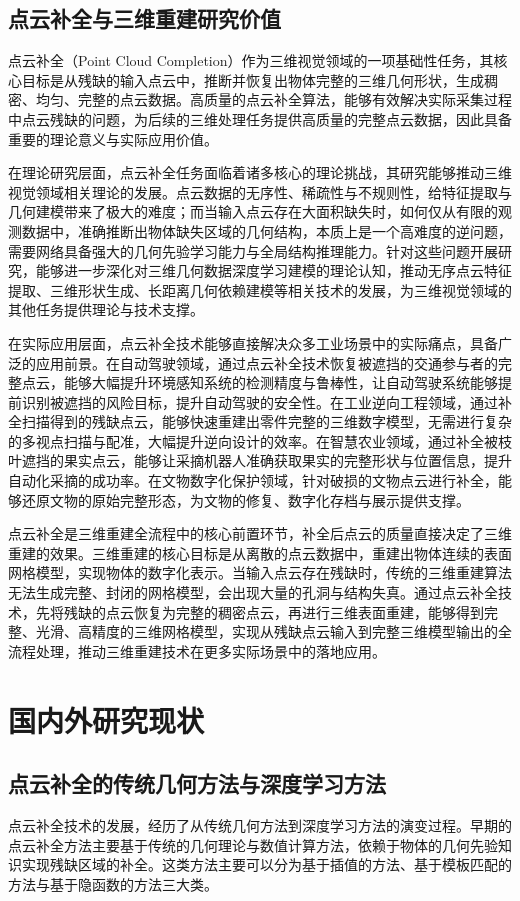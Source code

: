 \subsection{点云补全与三维重建研究价值}
点云补全（Point Cloud Completion）作为三维视觉领域的一项基础性任务，其核心目标是从残缺的输入点云中，推断并恢复出物体完整的三维几何形状，生成稠密、均匀、完整的点云数据。高质量的点云补全算法，能够有效解决实际采集过程中点云残缺的问题，为后续的三维处理任务提供高质量的完整点云数据，因此具备重要的理论意义与实际应用价值。

在理论研究层面，点云补全任务面临着诸多核心的理论挑战，其研究能够推动三维视觉领域相关理论的发展。点云数据的无序性、稀疏性与不规则性，给特征提取与几何建模带来了极大的难度；而当输入点云存在大面积缺失时，如何仅从有限的观测数据中，准确推断出物体缺失区域的几何结构，本质上是一个高难度的逆问题，需要网络具备强大的几何先验学习能力与全局结构推理能力。针对这些问题开展研究，能够进一步深化对三维几何数据深度学习建模的理论认知，推动无序点云特征提取、三维形状生成、长距离几何依赖建模等相关技术的发展，为三维视觉领域的其他任务提供理论与技术支撑。

在实际应用层面，点云补全技术能够直接解决众多工业场景中的实际痛点，具备广泛的应用前景。在自动驾驶领域，通过点云补全技术恢复被遮挡的交通参与者的完整点云，能够大幅提升环境感知系统的检测精度与鲁棒性，让自动驾驶系统能够提前识别被遮挡的风险目标，提升自动驾驶的安全性。在工业逆向工程领域，通过补全扫描得到的残缺点云，能够快速重建出零件完整的三维数字模型，无需进行复杂的多视点扫描与配准，大幅提升逆向设计的效率。在智慧农业领域，通过补全被枝叶遮挡的果实点云，能够让采摘机器人准确获取果实的完整形状与位置信息，提升自动化采摘的成功率。在文物数字化保护领域，针对破损的文物点云进行补全，能够还原文物的原始完整形态，为文物的修复、数字化存档与展示提供支撑。

点云补全是三维重建全流程中的核心前置环节，补全后点云的质量直接决定了三维重建的效果。三维重建的核心目标是从离散的点云数据中，重建出物体连续的表面网格模型，实现物体的数字化表示。当输入点云存在残缺时，传统的三维重建算法无法生成完整、封闭的网格模型，会出现大量的孔洞与结构失真。通过点云补全技术，先将残缺的点云恢复为完整的稠密点云，再进行三维表面重建，能够得到完整、光滑、高精度的三维网格模型，实现从残缺点云输入到完整三维模型输出的全流程处理，推动三维重建技术在更多实际场景中的落地应用。

\section{国内外研究现状}

\subsection{点云补全的传统几何方法与深度学习方法}
点云补全技术的发展，经历了从传统几何方法到深度学习方法的演变过程。早期的点云补全方法主要基于传统的几何理论与数值计算方法，依赖于物体的几何先验知识实现残缺区域的补全。这类方法主要可以分为基于插值的方法、基于模板匹配的方法与基于隐函数的方法三大类。

